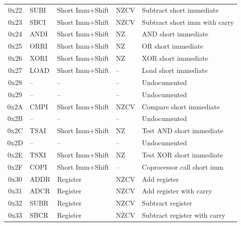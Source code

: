 \begin{table}[H]
\begin{tabular}{clllp{4cm}}
		0x22            & SUBI              & Short Imm+Shift & NZCV           & Subtract short immediate      \\
		0x23            & SBCI              & Short Imm+Shift & NZCV           & Subtract short imm with carry \\
		0x24            & ANDI              & Short Imm+Shift & NZ             & AND short immediate           \\
		0x25            & ORRI              & Short Imm+Shift & NZ             & OR short immediate            \\
		0x26            & XORI              & Short Imm+Shift & NZ             & XOR short immediate           \\
		0x27            & LOAD              & Short Imm+Shift & --             & Load short immediate          \\
		0x28            & --                & --              & --             & Undocumented                  \\
		0x29            & --                & --              & --             & Undocumented                  \\
		0x2A            & CMPI              & Short Imm+Shift & NZCV           & Compare short immediate       \\
		0x2B            & --                & --              & --             & Undocumented                  \\
		0x2C            & TSAI              & Short Imm+Shift & NZ             & Test AND short immediate      \\
		0x2D            & --                & --              & --             & Undocumented                  \\
		0x2E            & TSXI              & Short Imm+Shift & NZ             & Test XOR short immediate      \\
		0x2F            & COPI              & Short Imm+Shift & --             & Coprocessor call short imm    \\
		\midrule
		0x30            & ADDR              & Register        & NZCV           & Add register                  \\
		0x31            & ADCR              & Register        & NZCV           & Add register with carry       \\
		0x32            & SUBR              & Register        & NZCV           & Subtract register             \\
		0x33            & SBCR              & Register        & NZCV           & Subtract register with carry  \\

\end{tabular}
\end{table}
